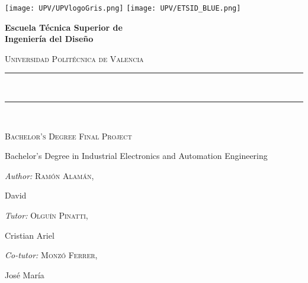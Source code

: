 \begin{titlepage}
	\centering
	\texttt{[image: UPV/UPVlogoGris.png]}
	\hfill{}
	\texttt{[image: UPV/ETSID\_BLUE.png]}
	\\[1cm]
	{\bfseries\LARGE {Escuela T\'ecnica Superior de\\ Ingenier\'ia del Dise\~{n}o} \par}
	{\scshape\Large {Universidad Polit\'ecnica de Valencia} \par}
	\vfill{}
	\textcolor{coloretsid}{\rule{\linewidth}{0.2 mm}} \\[0.4 cm]
    \def\baselinestretch{1.5}\selectfont
	{\scshape\huge{\thetitle }}
	\textcolor{coloretsid}{\rule{\linewidth}{0.2 mm}} \\[0.4 cm]
	{\scshape\Large {Bachelor's Degree Final Project} \par}
    {\normalsize {Bachelor's Degree in Industrial Electronics and Automation Engineering}}
	\vfill
    \raggedright
	{\normalsize\emph{{Author:}}}
	{\normalsize\scshape {Ram\'on Alam\'an,}} 
	{\normalsize{David}\par}
    {\normalsize\emph{{Tutor:}}}
	{\normalsize\scshape {Olguín Pinatti,}} 
	{\normalsize{Cristian Ariel}\par}
    {\normalsize\emph{{Co-tutor:}}}
	{\normalsize\scshape {Monzó Ferrer,}} 
	{\normalsize{José María}\par}
	\vspace{0.4cm}
\end{titlepage}